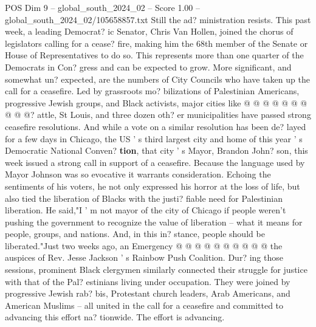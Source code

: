 \begin{textsample}{POS Dim 9 – global\_south\_2024\_02 – Score 1.00 – global\_south\_2024\_02/105658857.txt}
Still the ad? ministration resists.
This past week, a leading Democrat? ic Senator, Chris Van Hollen, joined the chorus of legislators calling for a cease? fire, making him the 68th member of the Senate or House of Representatives to do so.
This represents more than one quarter of the Democrats in Con? gress and can be expected to grow.
More significant, and somewhat un? expected, are the numbers of City Councils who have taken up the call for a ceasefire.
Led by grassroots mo? bilizations of Palestinian Americans, progressive Jewish groups, and Black activists, major cities like @ @ @ @ @ @ @ @ @ @? attle, St Louis, and three dozen oth? er municipalities have passed strong ceasefire resolutions.
And while a vote on a similar resolution has been de? layed for a few days in Chicago, the US ' s third largest city and home of this year ' s Democratic National Conven? \textbf{tion}, that city ' s Mayor, Brandon John? son, this week issued a strong call in support of a ceasefire.
Because the language used by Mayor Johnson was so evocative it warrants consideration.
Echoing the sentiments of his voters, he not only expressed his horror at the loss of life, but also tied the liberation of Blacks with the justi? fiable need for Palestinian liberation.
He said,"I ' m not mayor of the city of Chicago if people weren't pushing the government to recognize the value of liberation -- what it means for people, groups, and nations.
And, in this in? stance, people should be liberated."Just two weeks ago, an Emergency @ @ @ @ @ @ @ @ @ @ the auspices of Rev.
Jesse Jackson ' s Rainbow Push Coalition.
Dur? ing those sessions, prominent Black clergymen similarly connected their struggle for justice with that of the Pal? estinians living under occupation.
They were joined by progressive Jewish rab? bis, Protestant church leaders, Arab Americans, and American Muslims -- all united in the call for a ceasefire and committed to advancing this effort na? tionwide.
The effort is advancing.

\end{textsample}
